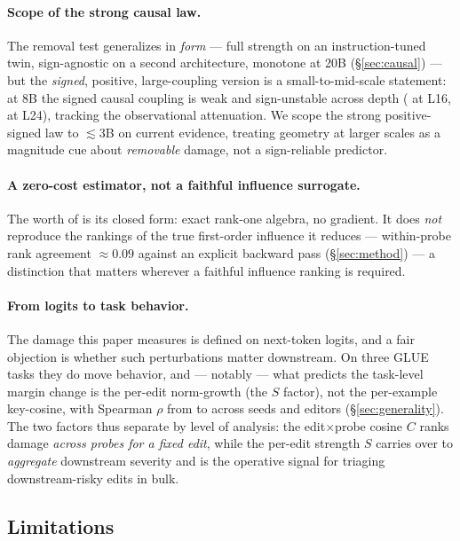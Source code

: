 \paragraph{Scope of the strong causal law.} The removal test generalizes in
\emph{form} --- full strength on an instruction-tuned twin, sign-agnostic on a
second architecture, monotone at 20B (\S\ref{sec:causal}) --- but the
\emph{signed}, positive, large-coupling version is a small-to-mid-scale
statement: at 8B the signed causal coupling is weak and sign-unstable across
depth (\eightbCausalRhoLsixteen{} at L16, \eightbCausalRhoLtwentyfour{} at
L24), tracking the observational attenuation. We scope the strong
positive-signed law to $\lesssim$3B on current evidence, treating geometry at
larger scales as a magnitude cue about \emph{removable} damage, not a
sign-reliable predictor.

\paragraph{A zero-cost estimator, not a faithful influence surrogate.} The
worth of \SxC{} is its closed form: exact rank-one algebra, no gradient. It
does \emph{not} reproduce the rankings of the true first-order influence it
reduces --- within-probe rank agreement
$\approx0.09$ against an explicit backward pass (\S\ref{sec:method}) --- a
distinction that matters wherever a faithful influence ranking is required.

\paragraph{From logits to task behavior.} The damage this paper measures is
defined on next-token logits, and a fair objection is whether such perturbations
matter downstream. On three GLUE tasks they do move behavior, and --- notably
--- what predicts the task-level margin change is the per-edit norm-growth (the
$S$ factor), not the per-example key-cosine, with Spearman $\rho$ from
\glueNGrhoLo{} to \glueNGrhoHi{} across seeds and editors (\S\ref{sec:generality}).
The two factors thus separate by level of analysis: the edit$\times$probe
cosine $C$ ranks damage \emph{across probes for a fixed edit}, while the
per-edit strength $S$ carries over to \emph{aggregate} downstream severity and
is the operative signal for triaging downstream-risky edits in bulk.

\subsection{Limitations}
\label{sec:limitations}

